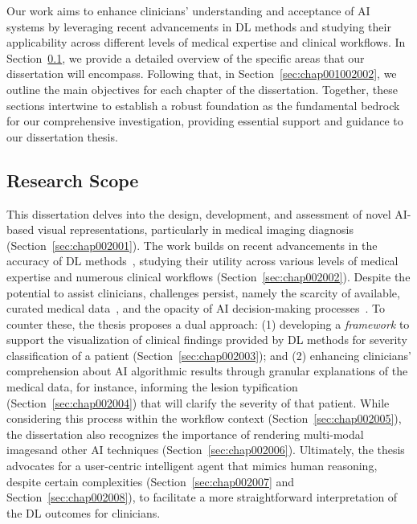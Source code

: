 Our work aims to enhance clinicians' understanding and acceptance of \ac{AI} systems by leveraging recent advancements in \ac{DL} methods and studying their applicability across different levels of medical expertise and clinical workflows.
In Section~\ref{sec:chap001002001}, we provide a detailed overview of the specific areas that our dissertation will encompass.
Following that, in Section~\ref{sec:chap001002002}, we outline the main objectives for each chapter of the dissertation.
Together, these sections intertwine to establish a robust foundation as the fundamental bedrock for our comprehensive investigation, providing essential support and guidance to our dissertation thesis.

\subsection{Research Scope}
\label{sec:chap001002001}

This dissertation delves into the design, development, and assessment of novel \ac{AI}-based visual representations, particularly in medical imaging diagnosis (Section~\ref{sec:chap002001}).
The work builds on recent advancements in the accuracy of \ac{DL} methods~\cite{9098470}, studying their utility across various levels of medical expertise and numerous clinical workflows (Section~\ref{sec:chap002002}).
Despite the potential to assist clinicians, challenges persist, namely the scarcity of available, curated medical data~\cite{10.1145/3313831.3376290}, and the opacity of \ac{AI} decision-making processes~\cite{Yue_2020_CVPR}.
To counter these, the thesis proposes a dual approach:
(1) developing a {\it framework} to support the visualization of clinical findings provided by \ac{DL} methods for severity classification of a patient (Section~\ref{sec:chap002003}); and
(2) enhancing clinicians' comprehension about \ac{AI} algorithmic results through granular explanations of the medical data, for instance, informing the lesion typification (Section~\ref{sec:chap002004}) that will clarify the severity of that patient.
While considering this process within the workflow context (Section~\ref{sec:chap002005}), the dissertation also recognizes the importance of rendering multi-modal images\footnotemark[3] and other \ac{AI} techniques (Section~\ref{sec:chap002006}).
Ultimately, the thesis advocates for a user-centric intelligent agent that mimics human reasoning, despite certain complexities (Section~\ref{sec:chap002007} and Section~\ref{sec:chap002008}), to facilitate a more straightforward interpretation of the \ac{DL} outcomes for clinicians.

